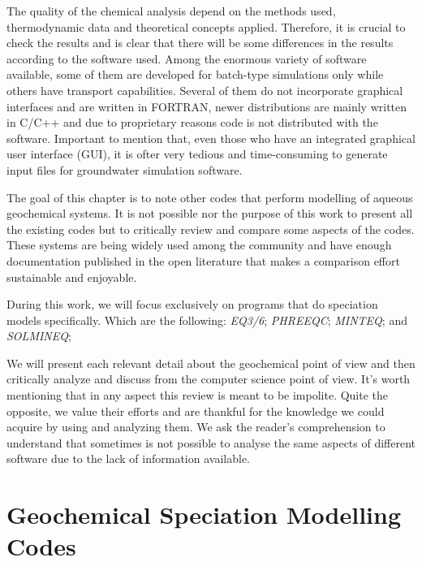 \documentclass[ppgc,mestrado,english]{iiufrgs}
\begin{document}
The quality of the chemical analysis depend on the methods used, thermodynamic data and theoretical concepts applied. Therefore, it is crucial to check the results and is clear that there will be some differences in the results according to the software used. Among the enormous variety of software available, some of them are developed for batch-type simulations only while others have transport capabilities. Several of them do not incorporate graphical interfaces and are written in FORTRAN, newer distributions are mainly written in C/C++ and due to proprietary reasons code is not distributed with the software. Important to mention that, even those who have an integrated graphical user interface (GUI), it is ofter very tedious and time-consuming to generate input files for groundwater simulation software.

The goal of this chapter is to note other codes that perform modelling of aqueous geochemical systems. It is not possible nor the purpose of this work to present all the existing codes but to critically review and compare some aspects of the codes. These systems are being widely used among the community and have enough documentation published in the open literature that makes a comparison effort sustainable and enjoyable.

During this work, we will focus exclusively on programs that do speciation models specifically. Which are the following: \emph{EQ3/6}; \emph{PHREEQC}; \emph{MINTEQ}; and \emph{SOLMINEQ};

We will present each relevant detail about the geochemical point of view and then critically analyze and discuss from the computer science point of view. It's worth mentioning that in any aspect this review is meant to be impolite. Quite the opposite, we value their efforts and are thankful for the knowledge we could acquire by using and analyzing them. We ask the reader's comprehension to understand that sometimes is not possible to analyse the same aspects of different software due to the lack of information available.


\section{Geochemical Speciation Modelling Codes}

\end{document}
